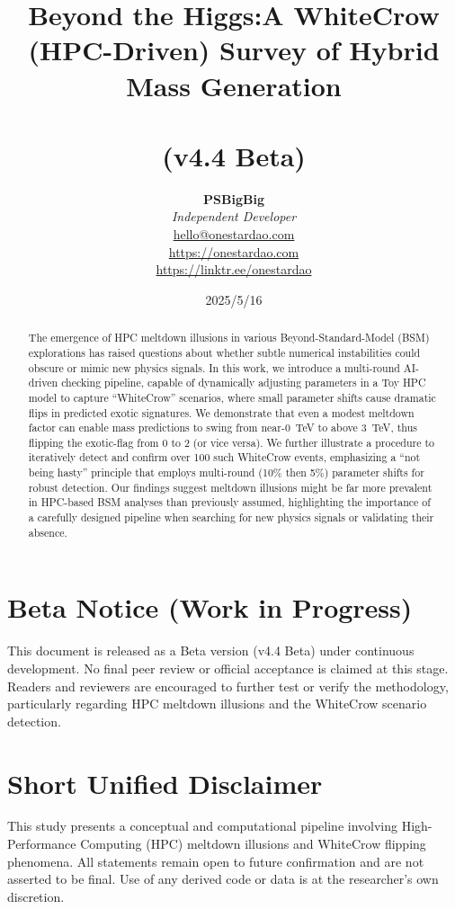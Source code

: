 \documentclass[11pt]{article}
\title{
  \textbf{Beyond the Higgs:A WhiteCrow (HPC-Driven) Survey of Hybrid Mass Generation}\\
\\
  \vspace{0.3em}
  \large (v4.4 Beta)
}
\author{
  \textbf{PSBigBig}\\
  \textit{Independent Developer}\\
  \href{mailto:hello@onestardao.com}{hello@onestardao.com}\\
  \url{https://onestardao.com}\\
  \url{https://linktr.ee/onestardao}
}
\date{2025/5/16}
\begin{document}
\maketitle

\section*{Beta Notice (Work in Progress)}
\label{sec:beta-notice}
This document is released as a Beta version (v4.4 Beta) under continuous development. 
No final peer review or official acceptance is claimed at this stage. 
Readers and reviewers are encouraged to further test or verify the methodology, 
particularly regarding HPC meltdown illusions and the WhiteCrow scenario detection.

\section*{Short Unified Disclaimer}
This study presents a conceptual and computational pipeline involving 
High-Performance Computing (HPC) meltdown illusions and WhiteCrow flipping phenomena. 
All statements remain open to future confirmation and are not asserted to be final. 
Use of any derived code or data is at the researcher's own discretion.

\begin{abstract}
The emergence of HPC meltdown illusions 
in various Beyond-Standard-Model (BSM) explorations 
has raised questions about whether subtle numerical instabilities 
could obscure or mimic new physics signals. 
In this work, we introduce a multi-round AI-driven checking pipeline, 
capable of dynamically adjusting parameters in a Toy HPC model 
to capture ``WhiteCrow'' scenarios, where small parameter shifts 
cause dramatic flips in predicted exotic signatures. 
We demonstrate that even a modest meltdown factor can enable 
mass predictions to swing from near-0~TeV to above 3~TeV, 
thus flipping the exotic-flag from 0 to 2 (or vice versa). 
We further illustrate a procedure to iteratively detect and confirm 
over 100 such WhiteCrow events, emphasizing a ``not being hasty'' principle 
that employs multi-round (10\% then 5\%) parameter shifts 
for robust detection. 
Our findings suggest meltdown illusions might be far more prevalent 
in HPC-based BSM analyses than previously assumed, 
highlighting the importance of a carefully designed pipeline 
when searching for new physics signals or validating their absence.
\end{abstract}
\end{document}
